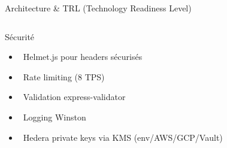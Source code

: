 \documentclass[aspectratio=169,11pt]{beamer}
\begin{document}
\begin{frame}{Architecture \& TRL (Technology Readiness Level)}
\begin{columns}[T]
\vspace{0.2cm}

\begin{alertblock}{Sécurité}
\tiny
\begin{itemize}
    \item \faShieldAlt~Helmet.js pour headers sécurisés
    \item \faLock~Rate limiting (8 TPS)
    \item \faCheckDouble~Validation express-validator
    \item \faFileAlt~Logging Winston
    \item \faKey~Hedera private keys via KMS (env/AWS/GCP/Vault)
\end{itemize}
\end{alertblock}
\end{columns}

\end{frame}
\end{document}
